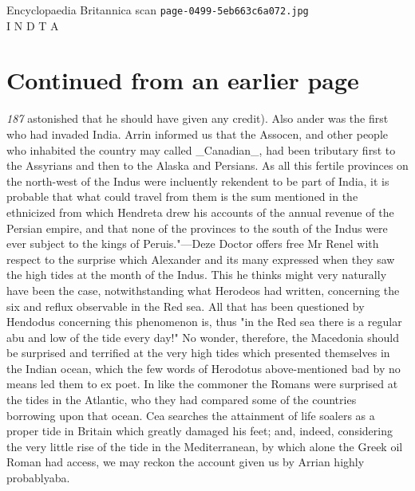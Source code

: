 \documentclass{article}
\begin{document}
\begin{center}
{\Large Encyclopaedia Britannica scan \texttt{page-0499-5eb663c6a072.jpg}}\\[0.5em]
I N D T A
\end{center}
\section*{Continued from an earlier page}
\textit{187}
astonished that he should have given any credit). Also ander was the first who had invaded India. Arrin informed us that the Assocen, and other people who inhabited the country may called \_Canadian\_, had been tributary first to the Assyrians and then to the Alaska and Persians. As all this fertile provinces on the north-west of the Indus were incluently rekendent to be part of India, it is probable that what could travel from them is the sum mentioned in the ethnicized from which Hendreta drew his accounts of the annual revenue of the Persian empire, and that none of the provinces to the south of the Indus were ever subject to the kings of Peruis."—Deze Doctor offers free Mr Renel with respect to the surprise which Alexander and its many expressed when they saw the high tides at the month of the Indus. This he thinks might very naturally have been the case, notwithstanding what Herodeos had written, concerning the six and reflux observable in the Red sea. All that has been questioned by Hendodus concerning this phenomenon is, thus "in the Red sea there is a regular abu and low of the tide every day!" No wonder, therefore, the Macedonia should be surprised and terrified at the very high tides which presented themselves in the Indian ocean, which the few words of Herodotus above-mentioned bad by no means led them to ex poet. In like the commoner the Romans were surprised at the tides in the Atlantic, who they had compared some of the countries borrowing upon that ocean. Cea searches the attainment of life soalers as a proper tide in Britain which greatly damaged his feet; and, indeed, considering the very little rise of the tide in the Mediterranean, by which alone the Greek oil Roman had access, we may reckon the account given us by Arrian highly probablyaba.
\end{document}
